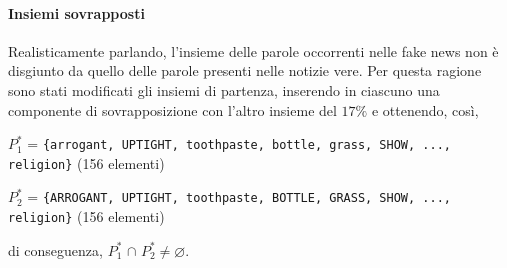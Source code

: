 \documentclass[12pt]{report}
\theoremstyle{definition}
\let\emptyset\varnothing
\begin{document}
\paragraph{Insiemi sovrapposti}
Realisticamente parlando, l'insieme delle parole occorrenti nelle fake news non è disgiunto da quello delle parole presenti nelle notizie vere.
Per questa ragione sono stati modificati gli insiemi di partenza, inserendo in ciascuno una componente di sovrapposizione con l'altro insieme del $17 \%$ e ottenendo, così,
\begin{center}
    $P_{1}^{*}$ = \texttt{\{arrogant, UPTIGHT, toothpaste, bottle, grass, SHOW, ..., religion\}} (156 elementi)
\end{center}
\begin{center}
    $P_{2}^{*}$ = \texttt{\{ARROGANT, UPTIGHT, toothpaste, BOTTLE, GRASS, SHOW, ..., religion\}} (156 elementi)
\end{center}
di conseguenza, $P_{1}^{*}$ $\cap$ $P_{2}^{*} \neq \emptyset$.
\end{document}

